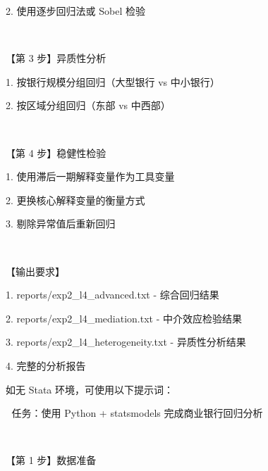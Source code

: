 \documentclass[
  american,
  chinese,
]{ctexart}
\begin{document}
\foreignlanguage{american}{2. }{使用逐步回归法或}\foreignlanguage{american}{ Sobel }{检验}\foreignlanguage{american}{}

\foreignlanguage{american}{}

~

{【第}\foreignlanguage{american}{ 3 }{步】异质性分析}\foreignlanguage{american}{}

\foreignlanguage{american}{1. }{按银行规模分组回归（大型银行}\foreignlanguage{american}{ vs }{中小银行）}\foreignlanguage{american}{}

\foreignlanguage{american}{2. }{按区域分组回归（东部}\foreignlanguage{american}{ vs }{中西部）}\foreignlanguage{american}{}

\foreignlanguage{american}{}

~

{【第}\foreignlanguage{american}{ 4 }{步】稳健性检验}\foreignlanguage{american}{}

\foreignlanguage{american}{1. }{使用滞后一期解释变量作为工具变量}\foreignlanguage{american}{}

\foreignlanguage{american}{2. }{更换核心解释变量的衡量方式}\foreignlanguage{american}{}

\foreignlanguage{american}{3. }{剔除异常值后重新回归}\foreignlanguage{american}{}

\foreignlanguage{american}{}

~

{【输出要求】}\foreignlanguage{american}{}

\foreignlanguage{american}{1. reports/exp2\_l4\_advanced.txt - }{综合回归结果}\foreignlanguage{american}{}

\foreignlanguage{american}{2. reports/exp2\_l4\_mediation.txt - }{中介效应检验结果}\foreignlanguage{american}{}

\foreignlanguage{american}{3. reports/exp2\_l4\_heterogeneity.txt - }{异质性分析结果}\foreignlanguage{american}{}

\foreignlanguage{american}{4. }{完整的分析报告}\foreignlanguage{american}{}

{如无}\foreignlanguage{american}{ Stata }{环境，可使用以下提示词：}\foreignlanguage{american}{}

\foreignlanguage{american}{🐍}\foreignlanguage{american}{ }{任务：使用}\foreignlanguage{american}{ Python + {statsmodels} }{完成商业银行回归分析}\foreignlanguage{american}{}

\foreignlanguage{american}{}

~

{【第}\foreignlanguage{american}{ 1 }{步】数据准备}\foreignlanguage{american}{}
\end{document}
